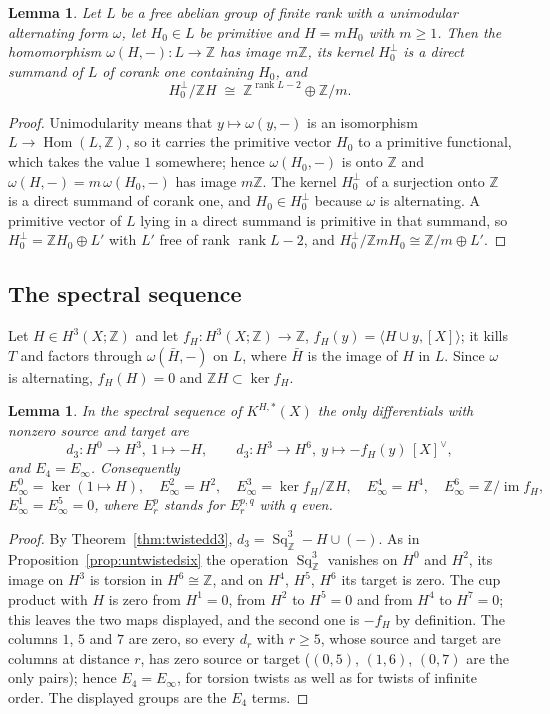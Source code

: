 \documentclass[reqno,11pt]{amsart}
\newtheorem{lemma}[theorem]{Lemma}
\theoremstyle{definition}
\newcommand{\ZZ}{\mathbb{Z}}
\newcommand{\Sq}{\operatorname{Sq}}
\newcommand{\rk}{\operatorname{rank}}
\DeclareMathOperator{\im}{im}
\begin{document}
\begin{lemma}\label{lem:lattice}
Let $L$ be a free abelian group of finite rank with a unimodular alternating form $\omega$, let $H_0\in L$ be primitive and $H=mH_0$ with $m\ge1$. Then the homomorphism $\omega(H,-)\colon L\to\ZZ$ has image $m\ZZ$, its kernel $H_0^\perp$ is a direct summand of $L$ of corank one containing $H_0$, and
\[
H_0^\perp/\ZZ H\;\cong\;\ZZ^{\rk L-2}\oplus\ZZ/m .
\]
\end{lemma}

\begin{proof}
Unimodularity means that $y\mapsto\omega(y,-)$ is an isomorphism $L\to\operatorname{Hom}(L,\ZZ)$, so it carries the primitive vector $H_0$ to a primitive functional, which takes the value $1$ somewhere; hence $\omega(H_0,-)$ is onto $\ZZ$ and $\omega(H,-)=m\,\omega(H_0,-)$ has image $m\ZZ$. The kernel $H_0^\perp$ of a surjection onto $\ZZ$ is a direct summand of corank one, and $H_0\in H_0^\perp$ because $\omega$ is alternating. A primitive vector of $L$ lying in a direct summand is primitive in that summand, so $H_0^\perp=\ZZ H_0\oplus L'$ with $L'$ free of rank $\rk L-2$, and $H_0^\perp/\ZZ mH_0\cong\ZZ/m\oplus L'$.
\end{proof}

\subsection{The spectral sequence}
Let $H\in H^3(X;\ZZ)$ and let $f_H\colon H^3(X;\ZZ)\to\ZZ$, $f_H(y)=\langle H\cup y,[X]\rangle$; it kills $T$ and factors through $\omega(\bar H,-)$ on $L$, where $\bar H$ is the image of $H$ in $L$. Since $\omega$ is alternating, $f_H(H)=0$ and $\ZZ H\subset\ker f_H$.

\begin{lemma}\label{lem:degenerate}
In the spectral sequence of $K^{H,*}(X)$ the only differentials with nonzero source and target are
\[
d_3\colon H^0\to H^3,\ 1\mapsto -H,\qquad d_3\colon H^3\to H^6,\ y\mapsto-f_H(y)\,[X]^\vee,
\]
and $E_4=E_\infty$. Consequently
\[
E_\infty^{0}=\ker(1\mapsto H),\quad E_\infty^{2}=H^2,\quad E_\infty^{3}=\ker f_H/\ZZ H,\quad E_\infty^{4}=H^4,\quad E_\infty^{6}=\ZZ/\im f_H,
\]
$E_\infty^1=E_\infty^5=0$, where $E_r^{p}$ stands for $E_r^{p,q}$ with $q$ even.
\end{lemma}

\begin{proof}
By Theorem~\ref{thm:twistedd3}, $d_3=\Sq^3_\ZZ-H\cup(-)$. As in Proposition~\ref{prop:untwistedsix} the operation $\Sq^3_\ZZ$ vanishes on $H^0$ and $H^2$, its image on $H^3$ is torsion in $H^6\cong\ZZ$, and on $H^4$, $H^5$, $H^6$ its target is zero. The cup product with $H$ is zero from $H^1=0$, from $H^2$ to $H^5=0$ and from $H^4$ to $H^7=0$; this leaves the two maps displayed, and the second one is $-f_H$ by definition. The columns $1$, $5$ and $7$ are zero, so every $d_r$ with $r\ge5$, whose source and target are columns at distance $r$, has zero source or target ($(0,5)$, $(1,6)$, $(0,7)$ are the only pairs); hence $E_4=E_\infty$, for torsion twists as well as for twists of infinite order. The displayed groups are the $E_4$ terms.
\end{proof}
\end{document}

